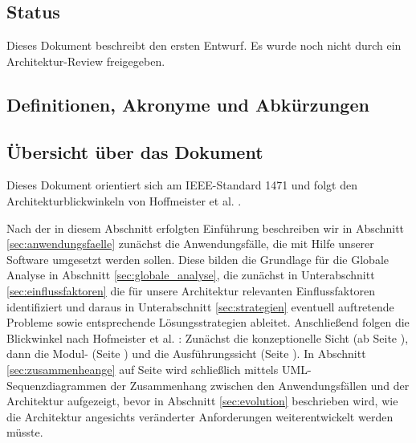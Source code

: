 \documentclass[enabledeprecatedfontcommands,fontsize=12pt,paper=a4,twoside,parskip=half]{scrartcl}
\newcounter{issue}
\newcounter{strategie}%
\begin{document}
\subsection{Status}

Dieses Dokument beschreibt den ersten Entwurf. Es wurde noch nicht durch ein
Architektur-Review freigegeben.


\subsection{Definitionen, Akronyme und Abkürzungen}


\printglossary[title=Definitionen,toctitle=Definitionen,nonumberlist]

\printglossary[type=\acronymtype, title=Akronyme und Abkürzungen,nonumberlist]

\glsaddall




\printbibliography[title=Referenzen,heading=subbibnumbered]

\label{sec:referenzen}

\subsection{Übersicht über das Dokument}

Dieses Dokument orientiert sich am IEEE-Standard 1471 \cite{IEEE2000} und folgt den Architekturblickwinkeln von Hoffmeister et al. \cite{Hofmeister:1999:ASA:322640}. 

Nach der in diesem Abschnitt erfolgten Einführung beschreiben wir in Abschnitt \vref{sec:anwendungsfaelle} zunächst die Anwendungsfälle, die mit Hilfe unserer Software umgesetzt werden sollen. Diese bilden die Grundlage für die Globale Analyse in Abschnitt \vref{sec:globale_analyse}, die zunächst in Unterabschnitt \vref{sec:einflussfaktoren} die für unsere Architektur relevanten Einflussfaktoren identifiziert und daraus in Unterabschnitt \vref{sec:strategien} eventuell auftretende Probleme sowie entsprechende Lösungsstrategien ableitet. Anschließend folgen die Blickwinkel nach Hofmeister et al. \cite{Hofmeister:1999:ASA:322640}: Zunächst die konzeptionelle Sicht (ab Seite \pageref{sec:konzeptionell}), dann die Modul- (Seite \pageref{sec:modulsicht}) und die Ausführungssicht (Seite \pageref{sec:ausfuehrung}). In Abschnitt \ref{sec:zusammenheange} auf Seite \pageref{sec:zusammenheange} wird schließlich mittels UML-Sequenzdiagrammen der Zusammenhang zwischen den Anwendungsfällen und der Architektur aufgezeigt, bevor in Abschnitt \vref{sec:evolution} beschrieben wird, wie die Architektur angesichts veränderter Anforderungen weiterentwickelt werden müsste. %
\end{document}
